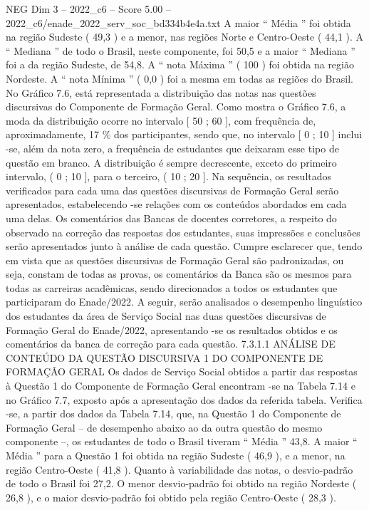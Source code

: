 \begin{textsample}{NEG Dim 3 – 2022\_c6 – Score 5.00 – 2022\_c6/enade\_2022\_serv\_soc\_bd334b4e4a.txt}
A maior “ Média ” foi obtida na região Sudeste ( 49,3 ) e a menor, nas regiões Norte e Centro-Oeste ( 44,1 ).
A “ Mediana ” de todo o Brasil, neste componente, foi 50,5 e a maior “ Mediana ” foi a da região Sudeste, de 54,8.
A “ nota Máxima ” ( 100 ) foi obtida na região Nordeste.
A “ nota Mínima ” ( 0,0 ) foi a mesma em todas as regiões do Brasil.
No Gráfico 7.6, está representada a distribuição das notas nas questões discursivas do Componente de Formação Geral.
Como mostra o Gráfico 7.6, a moda da distribuição ocorre no intervalo [ 50 ; 60 ], com frequência de, aproximadamente, 17 \% dos participantes, sendo que, no intervalo [ 0 ; 10 ] inclui -se, além da nota zero, a frequência de estudantes que deixaram esse tipo de questão em branco.
A distribuição é sempre decrescente, exceto do primeiro intervalo, ( 0 ; 10 ], para o terceiro, ( 10 ; 20 ].
Na sequência, os resultados verificados para cada uma das questões discursivas de Formação Geral serão apresentados, estabelecendo -se relações com os conteúdos abordados em cada uma delas.
Os comentários das Bancas de docentes corretores, a respeito do observado na correção das respostas dos estudantes, suas impressões e conclusões serão apresentados junto à análise de cada questão.
Cumpre esclarecer que, tendo em vista que as questões discursivas de Formação Geral são padronizadas, ou seja, constam de todas as provas, os comentários da Banca são os mesmos para todas as carreiras acadêmicas, sendo direcionados a todos os estudantes que participaram do Enade/2022.
A seguir, serão analisados o desempenho linguístico dos estudantes da área de Serviço Social nas duas questões discursivas de Formação Geral do Enade/2022, apresentando -se os resultados obtidos e os comentários da banca de correção para cada questão. 7.3.1.1 ANÁLISE DE CONTEÚDO DA QUESTÃO DISCURSIVA 1 DO COMPONENTE DE FORMAÇÃO GERAL Os dados de Serviço Social obtidos a partir das respostas à Questão 1 do Componente de Formação Geral encontram -se na Tabela 7.14 e no Gráfico 7.7, exposto após a apresentação dos dados da referida tabela.
Verifica -se, a partir dos dados da Tabela 7.14, que, na Questão 1 do Componente de Formação Geral – de desempenho abaixo ao da outra questão do mesmo componente –, os estudantes de todo o Brasil tiveram “ Média ” 43,8.
A maior “ Média ” para a Questão 1 foi obtida na região Sudeste ( 46,9 ), e a menor, na região Centro-Oeste ( 41,8 ).
Quanto à variabilidade das notas, o desvio-padrão de todo o Brasil foi 27,2.
O menor desvio-padrão foi obtido na região Nordeste ( 26,8 ), e o maior desvio-padrão foi obtido pela região Centro-Oeste ( 28,3 ).

\end{textsample}
